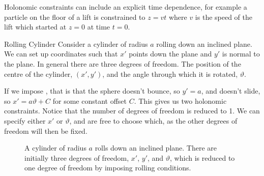 \documentclass[fleqn]{NotesClass}
\begin{document}
    Holonomic constraints can include an explicit time dependence, for example a particle on the floor of a lift is constrained to \(z = vt\) where \(v\) is the speed of the lift which started at \(z = 0\) at time \(t = 0\).
    
    \begin{exm}{Rolling Cylinder}{}
        Consider a cylinder of radius \(a\) rolling down an inclined plane.
        We can set up coordinates such that \(x'\) points down the plane and \(y'\) is normal to the plane.
        In general there are three degrees of freedom.
        The position of the centre of the cylinder, \((x', y')\), and the angle through which it is rotated, \(\vartheta\).
        
        If we impose , that is that the sphere doesn't bounce, so \(y' = a\), and doesn't slide, so \(x' = a\vartheta + C\) for some constant offset \(C\).
        This gives us two holonomic constraints.
        Notice that the number of degrees of freedom is reduced to 1.
        We can specify either \(x'\) or \(\vartheta\), and are free to choose which, as the other degrees of freedom will then be fixed.
    \end{exm}
    
    \begin{figure}
        \caption{A cylinder of radius \(a\) rolls down an inclined plane. There are initially three degrees of freedom, \(x'\), \(y'\), and \(\vartheta\), which is reduced to one degree of freedom by imposing rolling conditions.}
    \end{figure}
    
\end{document}
